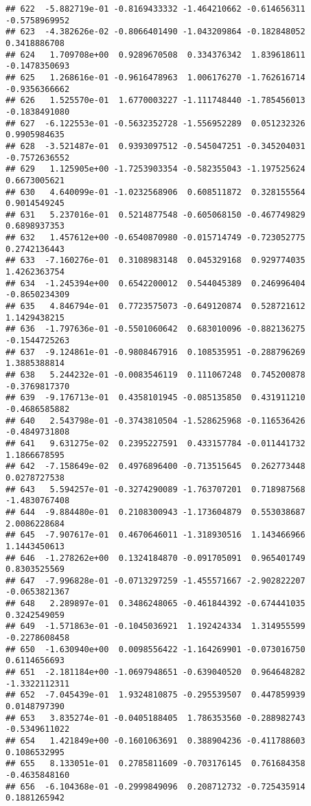 \documentclass[
]{article}
\begin{document}
\begin{verbatim}
## 622  -5.882719e-01 -0.8169433332 -1.464210662 -0.614656311 -0.5758969952
## 623  -4.382626e-02 -0.8066401490 -1.043209864 -0.182848052  0.3418886708
## 624   1.709708e+00  0.9289670508  0.334376342  1.839618611 -0.1478350693
## 625   1.268616e-01 -0.9616478963  1.006176270 -1.762616714 -0.9356366662
## 626   1.525570e-01  1.6770003227 -1.111748440 -1.785456013 -0.1838491080
## 627  -6.122553e-01 -0.5632352728 -1.556952289  0.051232326  0.9905984635
## 628  -3.521487e-01  0.9393097512 -0.545047251 -0.345204031 -0.7572636552
## 629   1.125905e+00 -1.7253903354 -0.582355043 -1.197525624  0.6673005621
## 630   4.640099e-01 -1.0232568906  0.608511872  0.328155564  0.9014549245
## 631   5.237016e-01  0.5214877548 -0.605068150 -0.467749829  0.6898937353
## 632   1.457612e+00 -0.6540870980 -0.015714749 -0.723052775  0.2742136443
## 633  -7.160276e-01  0.3108983148  0.045329168  0.929774035  1.4262363754
## 634  -1.245394e+00  0.6542200012  0.544045389  0.246996404 -0.8650234309
## 635   4.846794e-01  0.7723575073 -0.649120874  0.528721612  1.1429438215
## 636  -1.797636e-01 -0.5501060642  0.683010096 -0.882136275 -0.1544725263
## 637  -9.124861e-01 -0.9808467916  0.108535951 -0.288796269  1.3885388814
## 638   5.244232e-01 -0.0083546119  0.111067248  0.745200878 -0.3769817370
## 639  -9.176713e-01  0.4358101945 -0.085135850  0.431911210 -0.4686585882
## 640   2.543798e-01 -0.3743810504 -1.528625968 -0.116536426 -0.4849731808
## 641   9.631275e-02  0.2395227591  0.433157784 -0.011441732  1.1866678595
## 642  -7.158649e-02  0.4976896400 -0.713515645  0.262773448  0.0278727538
## 643   5.594257e-01 -0.3274290089 -1.763707201  0.718987568 -1.4830767408
## 644  -9.884480e-01  0.2108300943 -1.173604879  0.553038687  2.0086228684
## 645  -7.907617e-01  0.4670646011 -1.318930516  1.143466966  1.1443450613
## 646  -1.278262e+00  0.1324184870 -0.091705091  0.965401749  0.8303525569
## 647  -7.996828e-01 -0.0713297259 -1.455571667 -2.902822207 -0.0653821367
## 648   2.289897e-01  0.3486248065 -0.461844392 -0.674441035  0.3242549059
## 649  -1.571863e-01 -0.1045036921  1.192424334  1.314955599 -0.2278608458
## 650  -1.630940e+00  0.0098556422 -1.164269901 -0.073016750  0.6114656693
## 651  -2.181184e+00 -1.0697948651 -0.639040520  0.964648282 -1.3322112311
## 652  -7.045439e-01  1.9324810875 -0.295539507  0.447859939  0.0148797390
## 653   3.835274e-01 -0.0405188405  1.786353560 -0.288982743 -0.5349611022
## 654   1.421849e+00 -0.1601063691  0.388904236 -0.411788603  0.1086532995
## 655   8.133051e-01  0.2785811609 -0.703176145  0.761684358 -0.4635848160
## 656  -6.104368e-01 -0.2999849096  0.208712732 -0.725435914  0.1881265942

\end{verbatim}
\end{document}
